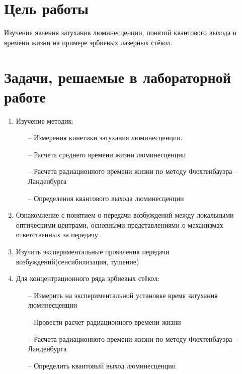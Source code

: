 
\section{Цель работы}\label{sec:purpose}

Изучение явления затухания люминесценции, понятий квантового выхода и времени жизни на примере эрбиевых лазерных стёкол.

\section{Задачи, решаемые в лабораторной работе}\label{sec:tasks}
\begin{enumerate}
	\item Изучение методик:
		\begin{itemize}
			\item[--] Измерения кинетики затухания люминесценции.
			\item[--] Расчета среднего времени жизни люминесценции
			\item[--] Расчета радиационного времени жизни по методу Фюхтенбауэра – Ланденбурга
			\item[--] Определения квантового выхода люминесценции
		\end{itemize}
	\item Ознакомление с понятием о передачи возбуждений между локальными
			оптическими центрами, основными представлениями о механизмах
			ответственных за передачу
	\item Изучить экспериментальные проявления передачи возбуждений(сенсибилизация, тушение)
	\item Для концентрационного ряда эрбиевых стёкол:
		\begin{itemize}
			\item[--] Измерить на экспериментальной установке время затухания люминесценции
			\item[--] Провести расчет радиационного времени жизни
			\item[--] Расчета радиационного времени жизни по методу Фюхтенбауэра – Ланденбурга
			\item[--] Определить квантовый выход люминесценции
		\end{itemize}
\end{enumerate}


